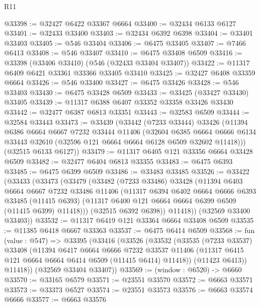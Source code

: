 \begin{lexlean}{R11}
\begin{coremodule}
@33398 := @32427 @6422 @33367 @6664
@33400 := @32434 @6133 @6127
@33401 := @32433 @33400
@33403 := @32434 @6392 @6398
@33404 := @33401 @33403
@33405 := @546 @33404
@33406 := @6475 @33405
@33407 := @7466 @6413
@33408 := @546 @33407
@33410 := @6475 @33408 @6509
@33416 := @33398 (@33406 @33410) (@546 (@32433 @33404 @33407))
@33422 := @11317 @6409 @6421 @33361 @33366 @33405 @33410
@33425 := @32427 @6408 @33359 @6664
@33426 := @546 @33400
@33427 := @6475 @33426
@33428 := @546 @33403
@33430 := @6475 @33428 @6509
@33433 := @33425 (@33427 @33430) @33405
@33439 := @11317 @6388 @6407 @33352 @33358 @33426 @33430
@33442 := @32477 @6387 @6813 @33351
@33443 := @32583 @6509
@33444 := @32584 @33443
@33473 := @33439
    (@33442
      (@7233 @33444)
      @33426
      (@11394
        @6386
        @6664
        @6667
        @7232
        @33444
        @11406
        (@32604
          @6385
          @6664
          @6666
          @6134
          @33443
          @32610
          (@32596 @121 @6664 @6664 @6128 @6509 @32602 @11418)))
      (@32515 @6133 @6127))
@33479 := @11317 @6405 @121 @33356 @6664 @33428 @6509
@33482 := @32477 @6404 @6813 @33355
@33483 := @6475 @6393
@33485 := @6475 @6399 @6509
@33486 := @33483 @33485
@33526 := @33422
    (@33433
      (@33473
        (@33479
          (@33482
            (@7233 @33486)
            @33428
            (@11394
              @6403
              @6664
              @6667
              @7232
              @33486
              @11406
              (@11317
                @6394
                @6402
                @6664
                @6666
                @6393
                @33485
                (@11415 @6393)
                (@11317 @6400 @121 @6664 @6664 @6399 @6509 (@11415 @6399) @11418)))
            (@32515 @6392 @6398))
          @11418))
      (@32569 @33400 @33403))
@33532 := @11317 @6419 @121 @33364 @6664 @33408 @6509
@33535 := @11385 @6418 @6667 @33363
@33537 := @6475 @6414 @6509
@33568 := fun (value : @547) =>
  @33395
    (@33416
      (@33526
        (@33532
          (@33535
            (@7233 @33537)
            @33408
            (@11394
              @6417
              @6664
              @6666
              @7232
              @33537
              @11406
              (@11317 @6415 @121 @6664 @6664 @6414 @6509 (@11415 @6414) @11418))
            (@11423 @6413))
          @11418))
      (@32569 @33404 @33407))
@33569 := (window : @6520) -> @6660
@33570 := @33165 @6579
@33571 := @23551 @33570
@33572 := @6663 @33571
@33573 := @33373 @6527
@33574 := @23551 @33573
@33576 := @6663 @33574 @6666
@33577 := @6663 @33576

\end{coremodule}
\end{lexlean}
